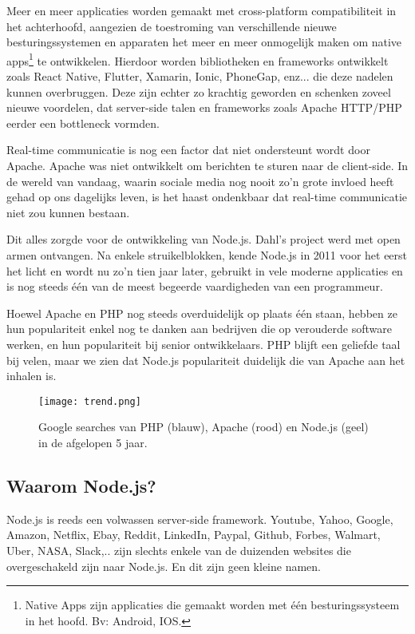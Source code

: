 Meer en meer applicaties worden gemaakt met cross-platform compatibiliteit in het achterhoofd, aangezien de toestroming van verschillende nieuwe besturingssystemen en apparaten het meer en meer onmogelijk maken om native apps\footnote{Native Apps zijn applicaties die gemaakt worden met één besturingssysteem in het hoofd. Bv: Android, IOS.} te ontwikkelen. Hierdoor worden bibliotheken en frameworks ontwikkelt zoals React Native, Flutter, Xamarin, Ionic, PhoneGap, enz... die deze nadelen kunnen overbruggen. Deze zijn echter zo krachtig geworden en schenken zoveel nieuwe voordelen, dat server-side talen en frameworks zoals Apache HTTP/PHP eerder een bottleneck vormden. 

Real-time communicatie is nog een factor dat niet ondersteunt wordt door Apache. Apache was niet ontwikkelt om berichten te sturen naar de client-side. In de wereld van vandaag, waarin sociale media nog nooit zo'n grote invloed heeft gehad op ons dagelijks leven, is het haast ondenkbaar dat real-time communicatie niet zou kunnen bestaan. 

Dit alles zorgde voor de ontwikkeling van Node.js. Dahl's project werd met open armen ontvangen. Na enkele struikelblokken, kende Node.js in 2011 voor het eerst het licht en wordt nu zo'n tien jaar later, gebruikt in vele moderne applicaties en is nog steeds één van de meest begeerde vaardigheden van een programmeur. \autocite{Patel2018}

Hoewel Apache en PHP nog steeds overduidelijk op plaats één staan, hebben ze hun populariteit enkel nog te danken aan bedrijven die op verouderde software werken, en hun populariteit bij senior ontwikkelaars. PHP blijft een geliefde taal bij velen, maar we zien dat Node.js populariteit duidelijk die van Apache aan het inhalen is. \autocite{SimilarTech}

\begin{figure}[h]
	\texttt{[image: trend.png]}
	\caption{Google searches van PHP (blauw), Apache (rood) en Node.js (geel) in de afgelopen 5 jaar.}
	\label{fig:trend}
\end{figure}

\subsection{Waarom Node.js?}
\label{sec:whyNode}
Node.js is reeds een volwassen server-side framework. Youtube, Yahoo, Google, Amazon, Netflix, Ebay, Reddit, LinkedIn, Paypal, Github, Forbes, Walmart, Uber, NASA, Slack,.. zijn slechts enkele van de duizenden websites die overgeschakeld zijn naar Node.js. En dit zijn geen kleine namen.

